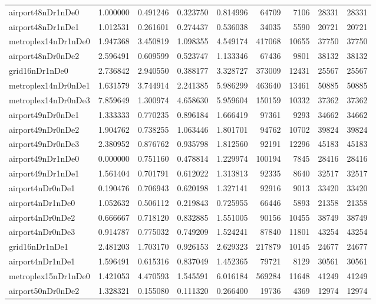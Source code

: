 \begin{longtable}{|l|r|r|r|r|r|r|r|r|}
airport48nDr1nDe0 & 1.000000 & 0.491246 & 0.323750 & 0.814996 & 64709 & 7106 & 28331 & 28331 \\
airport48nDr1nDe1 & 1.012531 & 0.261601 & 0.274437 & 0.536038 & 34035 & 5590 & 20721 & 20721 \\
metroplex14nDr1nDe0 & 1.947368 & 3.450819 & 1.098355 & 4.549174 & 417068 & 10655 & 37750 & 37750 \\
airport48nDr0nDe2 & 2.596491 & 0.609599 & 0.523747 & 1.133346 & 67436 & 9801 & 38132 & 38132 \\
grid16nDr1nDe0 & 2.736842 & 2.940550 & 0.388177 & 3.328727 & 373009 & 12431 & 25567 & 25567 \\
metroplex14nDr0nDe1 & 1.631579 & 3.744914 & 2.241385 & 5.986299 & 463640 & 13461 & 50885 & 50885 \\
metroplex14nDr0nDe3 & 7.859649 & 1.300974 & 4.658630 & 5.959604 & 150159 & 10332 & 37362 & 37362 \\
airport49nDr0nDe1 & 1.333333 & 0.770235 & 0.896184 & 1.666419 & 97361 & 9293 & 34662 & 34662 \\
airport49nDr0nDe2 & 1.904762 & 0.738255 & 1.063446 & 1.801701 & 94762 & 10702 & 39824 & 39824 \\
airport49nDr0nDe3 & 2.380952 & 0.876762 & 0.935798 & 1.812560 & 92191 & 12296 & 45183 & 45183 \\
airport49nDr1nDe0 & 0.000000 & 0.751160 & 0.478814 & 1.229974 & 100194 & 7845 & 28416 & 28416 \\
airport49nDr1nDe1 & 1.561404 & 0.701791 & 0.612022 & 1.313813 & 92335 & 8640 & 32517 & 32517 \\
airport4nDr0nDe1 & 0.190476 & 0.706943 & 0.620198 & 1.327141 & 92916 & 9013 & 33420 & 33420 \\
airport4nDr1nDe0 & 1.052632 & 0.506112 & 0.219843 & 0.725955 & 66446 & 5893 & 21358 & 21358 \\
airport4nDr0nDe2 & 0.666667 & 0.718120 & 0.832885 & 1.551005 & 90156 & 10455 & 38749 & 38749 \\
airport4nDr0nDe3 & 0.914787 & 0.775032 & 0.749209 & 1.524241 & 87840 & 11801 & 43254 & 43254 \\
grid16nDr1nDe1 & 2.481203 & 1.703170 & 0.926153 & 2.629323 & 217879 & 10145 & 24677 & 24677 \\
airport4nDr1nDe1 & 1.596491 & 0.615316 & 0.837049 & 1.452365 & 79721 & 8129 & 30561 & 30561 \\
metroplex15nDr1nDe0 & 1.421053 & 4.470593 & 1.545591 & 6.016184 & 569284 & 11648 & 41249 & 41249 \\
airport50nDr0nDe2 & 1.328321 & 0.155080 & 0.111320 & 0.266400 & 19736 & 4369 & 12974 & 12974 \\

\end{longtable}
